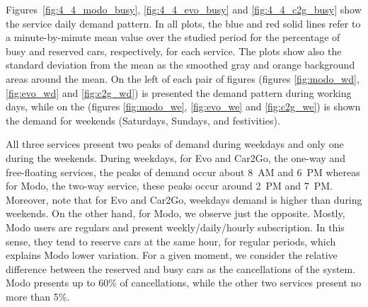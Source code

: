 Figures~\ref{fig:4_4_modo_busy}, \ref{fig:4_4_evo_busy} and \ref{fig:4_4_c2g_busy} show the service daily demand pattern. In all plots, the blue and red solid lines refer to a minute-by-minute mean value over the studied period for the percentage of busy and reserved cars, respectively, for each service. The plots show also the standard deviation from the mean as the smoothed gray and orange background areas around the mean. On the left of each pair of figures (figures \ref{fig:modo_wd}, \ref{fig:evo_wd} and \ref{fig:c2g_wd}) is presented the demand pattern during working days, while on the (figures \ref{fig:modo_we}, \ref{fig:evo_we} and \ref{fig:c2g_we}) is shown the demand for weekends (Saturdays, Sundays, and festivities). 


All three services present two peaks of demand during weekdays and only one during the weekends. During weekdays, for Evo and Car2Go, the one-way and free-floating services, the peaks of demand occur about 8~AM and 6~PM whereas for Modo, the two-way service, these peaks occur around 2~PM and 7~PM.
Moreover, note that for Evo and Car2Go, weekdays demand is higher than during weekends. On the other hand, for Modo, we observe just the opposite. 
Mostly, Modo users are regulars and present weekly/daily/hourly subscription. In this sense, they tend to reserve cars at the same hour, for regular periods, which explains Modo lower variation. For a given moment, we consider the relative difference between the reserved and busy cars as the cancellations of the system. Modo presents up to 60\% of cancellations, while the other two services present no more than 5\%. 




